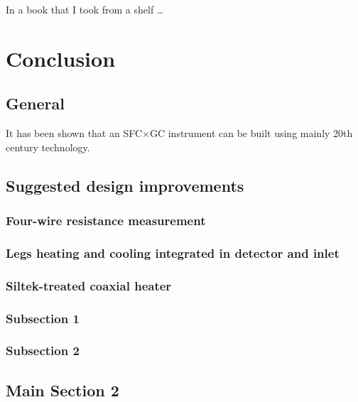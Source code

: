 
\begin{savequote}[45mm]
In a book that I took from a shelf \ldots
{}
\end{savequote}

\chapter{Conclusion} %

\label{Chapter8} %


\section{General}

It has been shown that an SFC×GC instrument can be built using mainly 20th century technology. 


\section{Suggested design improvements}

\subsection{Four-wire resistance measurement}
\subsection{Legs heating and cooling integrated in detector and inlet}
\subsection{Siltek-treated coaxial heater}

\subsection{Subsection 1}


\subsection{Subsection 2}


\section{Main Section 2}
